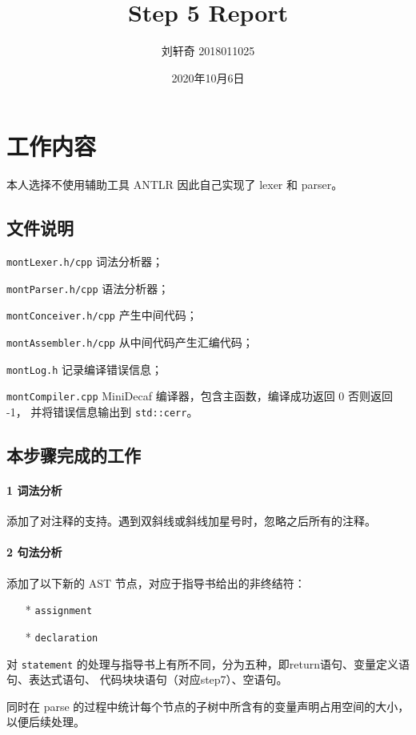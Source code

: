 \documentclass[UTF8]{ctexart}
\title{Step 5 Report}
\author{刘轩奇 2018011025}
\date{2020年10月6日}
\newcommand{\T}[1]{\texttt{{#1}}}
\begin{document}
    \maketitle
    \section{工作内容}
        本人选择不使用辅助工具 ANTLR 因此自己实现了 lexer 和 parser。
        \subsection{文件说明} 
            \T{montLexer.h/cpp} 词法分析器；

            \T{montParser.h/cpp} 语法分析器；

            \T{montConceiver.h/cpp} 产生中间代码；

            \T{montAssembler.h/cpp} 从中间代码产生汇编代码；
            
            \T{montLog.h} 记录编译错误信息；

            \T{montCompiler.cpp} MiniDecaf 编译器，包含主函数，编译成功返回 0 否则返回 -1，
            并将错误信息输出到 \T{std::cerr}。
        
        \subsection{本步骤完成的工作}

            \paragraph{1 词法分析} 添加了对注释的支持。遇到双斜线或斜线加星号时，忽略之后所有的注释。

            \paragraph{2 句法分析} 添加了以下新的 AST 节点，对应于指导书给出的非终结符：
            \begin{itemize}
                \item[*] \T{assignment}
                \item[*] \T{declaration}  
            \end{itemize}

            对 \T{statement} 的处理与指导书上有所不同，分为五种，即return语句、变量定义语句、表达式语句、
            代码块块语句（对应step7）、空语句。

            同时在 parse 的过程中统计每个节点的子树中所含有的变量声明占用空间的大小，以便后续处理。
\end{document}
